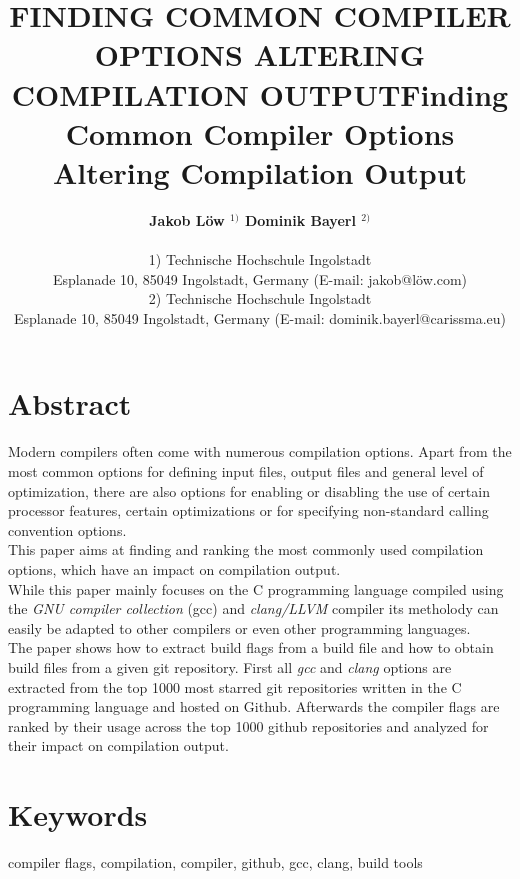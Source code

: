 \documentclass[9pt, a4paper, twocolumn]{article}
\title{FINDING COMMON COMPILER OPTIONS ALTERING COMPILATION OUTPUT}
\title{Finding Common Compiler Options Altering Compilation Output}
\author{\textbf{Jakob Löw $^{1)}$ Dominik Bayerl $^{2)}$} \\
	\\
	1) Technische Hochschule Ingolstadt \\
		Esplanade 10, 85049 Ingolstadt, Germany (E-mail: jakob@löw.com) \\
	2) Technische Hochschule Ingolstadt \\
		Esplanade 10, 85049 Ingolstadt, Germany (E-mail: dominik.bayerl@carissma.eu) \\}
\date{}
\begin{document}

\vspace{-4em}
\maketitle

\section*{Abstract}
Modern compilers often come with numerous compilation options. Apart from the most common options for defining input files, output files and general level of optimization, there are also options for enabling or disabling the use of certain processor features, certain optimizations or for specifying non-standard calling convention options. \\
This paper aims at finding and ranking the most commonly used compilation options, which have an impact on compilation output. \\
While this paper mainly focuses on the C programming language compiled using the \textit{GNU compiler collection} (gcc) and \textit{clang/LLVM} compiler its metholody can easily be adapted to other compilers or even other programming languages. \\
The paper shows how to extract build flags from a build file and how to obtain build files from a given git repository. 
First all \textit{gcc} and \textit{clang} options are extracted from the top 1000 most starred git repositories written in the C programming language and hosted on Github. Afterwards the compiler flags are ranked by their usage across the top 1000 github repositories and analyzed for their impact on compilation output.

\section*{Keywords}
compiler flags, compilation, compiler, github, gcc, clang, build tools

\restoregeometry
\end{document}
